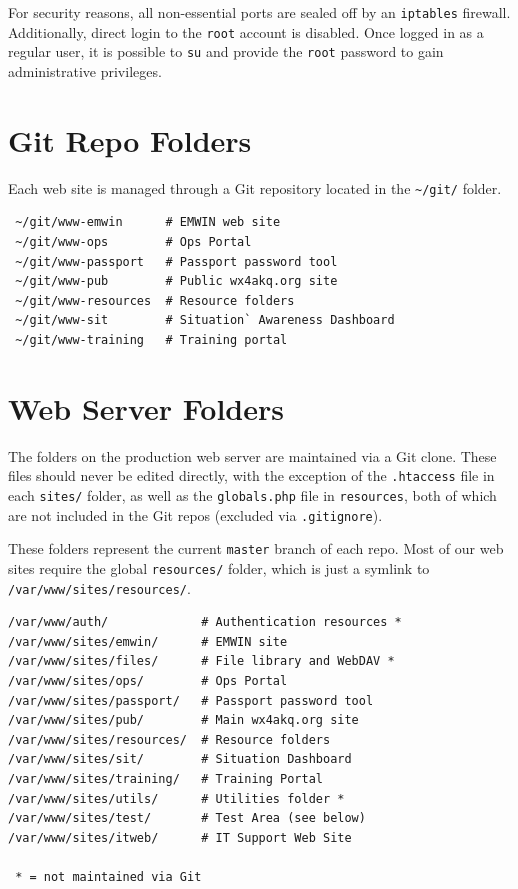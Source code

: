 \documentclass[pdflatex,letterpaper,twoside,12pt]{book}
\begin{document}
For security reasons, all non-essential ports are sealed off by an \texttt{iptables} firewall.  Additionally, direct login to the \texttt{root} account is disabled.  Once logged in as a regular user, it is possible to \texttt{su} and provide the \texttt{root} password to gain administrative privileges.


\section{Git Repo Folders}

Each web site is managed through a Git repository located in the \texttt{\~\//git/} folder.

\begin{verbatim}
 ~/git/www-emwin      # EMWIN web site
 ~/git/www-ops        # Ops Portal  
 ~/git/www-passport   # Passport password tool
 ~/git/www-pub        # Public wx4akq.org site
 ~/git/www-resources  # Resource folders
 ~/git/www-sit        # Situation` Awareness Dashboard
 ~/git/www-training   # Training portal
\end{verbatim}



\section{Web Server Folders}

The folders on the production web server are maintained via a Git clone.  These files should never be edited directly, with the exception of the \texttt{.htaccess} file in each \texttt{sites/} folder, as well as the \texttt{globals.php} file in \texttt{resources}, both of which are not included in the Git repos (excluded via \texttt{.gitignore}).

These folders represent the current \texttt{master} branch of each repo.  Most of our web sites require the global \texttt{resources/} folder, which is just a symlink to\\\texttt{/var/www/sites/resources/}.

\begin{verbatim}
/var/www/auth/             # Authentication resources *
/var/www/sites/emwin/      # EMWIN site
/var/www/sites/files/      # File library and WebDAV *
/var/www/sites/ops/        # Ops Portal
/var/www/sites/passport/   # Passport password tool
/var/www/sites/pub/        # Main wx4akq.org site
/var/www/sites/resources/  # Resource folders
/var/www/sites/sit/        # Situation Dashboard
/var/www/sites/training/   # Training Portal
/var/www/sites/utils/      # Utilities folder *
/var/www/sites/test/       # Test Area (see below)
/var/www/sites/itweb/      # IT Support Web Site

 * = not maintained via Git
\end{verbatim}
\end{document}
